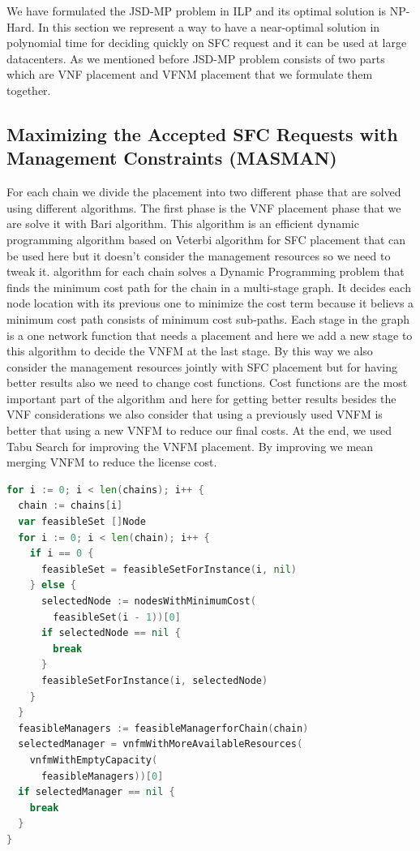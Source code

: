 We have formulated the JSD-MP problem in ILP and its optimal solution is NP-Hard.
In this section we represent a way to have a near-optimal solution in polynomial time for deciding quickly on SFC request and it can be used at large datacenters.
As we mentioned before JSD-MP problem consists of two parts which are VNF placement and VFNM placement that we formulate them together.

\subsection{Maximizing the Accepted SFC Requests with Management Constraints (MASMAN)}
For each chain we divide the placement into two different phase that are solved using different algorithms.
The first phase is the VNF placement phase that we are solve it with Bari \cite{Bari2015} algorithm.
This algorithm is an efficient dynamic programming algorithm based on Veterbi algorithm for SFC placement that can be used here but it doesn't consider the management resources so we need to tweak it.
\cite{Bari2015} algorithm for each chain solves a Dynamic Programming problem that finds the minimum cost path for the chain in a multi-stage graph.
It decides each node location with its previous one to minimize the cost term because it believs a minimum cost path consists of minimum cost sub-paths.
Each stage in the graph is a one network function that needs a placement and here we add a new stage to this algorithm to decide the VNFM at the last stage. By this way we also consider the management resources jointly with SFC placement but for having better results also we need to change cost functions.
Cost functions are the most important part of the \cite{Bari2015} algorithm and here for getting better results besides the VNF considerations we also consider
that using a previously used VNFM is better that using a new VNFM to reduce our final costs.
At the end, we used Tabu Search for improving the VNFM placement. By improving we mean merging VNFM to reduce the license cost.

\begin{lstlisting}[language=go]
for i := 0; i < len(chains); i++ {
  chain := chains[i]
  var feasibleSet []Node
  for i := 0; i < len(chain); i++ {
    if i == 0 {
      feasibleSet = feasibleSetForInstance(i, nil)
    } else {
      selectedNode := nodesWithMinimumCost(
        feasibleSet(i - 1))[0]
      if selectedNode == nil {
        break
      }
      feasibleSetForInstance(i, selectedNode)
    }
  }
  feasibleManagers := feasibleManagerforChain(chain)
  selectedManager = vnfmWithMoreAvailableResources(
    vnfmWithEmptyCapacity(
      feasibleManagers))[0]
  if selectedManager == nil {
    break
  }
}
\end{lstlisting}

